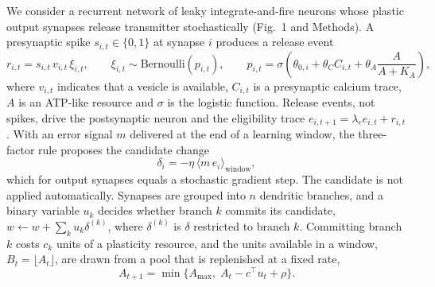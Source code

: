 \documentclass[12pt,a4paper]{article}
\begin{document}
We consider a recurrent network of leaky integrate-and-fire neurons whose plastic output synapses release transmitter stochastically (Fig.~1 and Methods). A presynaptic spike $s_{i,t}\in\{0,1\}$ at synapse $i$ produces a release event
\begin{equation}
r_{i,t}=s_{i,t}\,v_{i,t}\,\xi_{i,t},\qquad \xi_{i,t}\sim\mathrm{Bernoulli}(p_{i,t}),\qquad p_{i,t}=\sigma\!\left(\theta_{0,i}+\theta_{C}C_{i,t}+\theta_{A}\frac{A}{A+K_{A}}\right),
\label{eq:release}
\end{equation}
where $v_{i,t}$ indicates that a vesicle is available, $C_{i,t}$ is a presynaptic calcium trace, $A$ is an ATP-like resource and $\sigma$ is the logistic function. Release events, not spikes, drive the postsynaptic neuron and the eligibility trace $e_{i,t+1}=\lambda_{e}e_{i,t}+r_{i,t}$. With an error signal $m$ delivered at the end of a learning window, the three-factor rule proposes the candidate change
\begin{equation}
\delta_{i}=-\eta\,\big\langle m\,e_{i}\big\rangle_{\mathrm{window}},
\label{eq:threefactor}
\end{equation}
which for output synapses equals a stochastic gradient step\cite{bellec2020}. The candidate is not applied automatically. Synapses are grouped into $n$ dendritic branches\cite{poirazi2020}, and a binary variable $u_{k}$ decides whether branch $k$ commits its candidate, $w\leftarrow w+\sum_{k}u_{k}\delta^{(k)}$, where $\delta^{(k)}$ is $\delta$ restricted to branch $k$. Committing branch $k$ costs $c_{k}$ units of a plasticity resource, and the units available in a window, $B_{t}=\lfloor A_{t}\rfloor$, are drawn from a pool that is replenished at a fixed rate,
\begin{equation}
A_{t+1}=\min\!\big\{A_{\max},\;A_{t}-c^{\top}u_{t}+\rho\big\}.
\label{eq:atp}
\end{equation}
\end{document}
